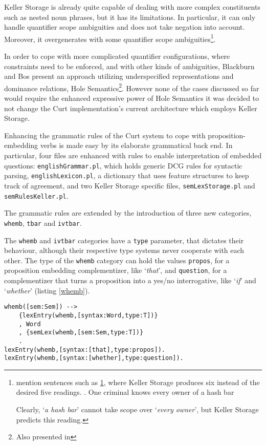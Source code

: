 \documentclass[a4paper]{article}
\newcommand{\abbr}{\textsf} %
\newcommand{\code}[1]{\texttt{#1}} %
\newcommand{\pn}{\textsf} %
\newcommand{\example}[1]{`\textit{#1}'} %
\newcommand{\curt}{\pn{Curt}}
\theoremstyle{remark}
\theoremstyle{remark}
\theoremstyle{definition}
\theoremstyle{definition}
\begin{document}
\pn{Keller Storage} is already quite capable
of dealing with more complex constituents such as nested noun phrases, but it
has its limitations. In particular, it can only handle quantifier scope
ambiguities and does not take negation into account. Moreover, it overgenerates
with some quantifier scope ambiguities\footnote{\cite{blackburnbos:cl1} mention
sentences such as \ref{ex:kellersucks}, where Keller Storage produces six
instead of the desired five readings.
\ex. One criminal knows every owner of a hash bar\label{ex:kellersucks}

Clearly, \example{a hash bar} cannot take scope over \example{every owner}, but
Keller Storage predicts this reading.}.

In order to cope with more complicated quantifier configurations, where
constraints need to be enforced, and with other kinds of ambiguities,
Blackburn and Bos present an approach utilizing underspecified representations and
dominance relations, \pn{Hole Semantics}\footnote{Also presented in %
}. 
However none of the cases discussed so far would require the enhanced
expressive power of \pn{Hole Semantics} it was decided to not change the \curt{}
implementation's current architecture which employs \pn{Keller Storage}.

Enhancing the grammatic rules of the \curt{} system to cope with
proposition-embedding verbs is made easy by its elaborate grammatical back
end. In particular, four files are enhanced with rules to enable interpretation
of embedded questions: \code{englishGrammar.pl}, which holds generic \abbr{DCG}
rules for syntactic parsing, \code{englishLexicon.pl}, a dictionary that uses
feature structures to keep track of agreement, and two \pn{Keller Storage}
specific files, \code{semLexStorage.pl} and \code{semRulesKeller.pl}.

The grammatic rules are extended by the introduction of three new categories,
\code{whemb}, \code{tbar} and \code{ivtbar}.

The \code{whemb} and \code{ivtbar} categories have a \code{type} parameter, that dictates
their behaviour, although their respective type systems never cooperate with
each other. The type of the \code{whemb} category can hold the values
\code{propos}, for a proposition embedding complementizer, like \example{that},
and \code{question}, for a complementizer that turns a proposition into a yes/no
interrogative, like \example{if} and \example{whether} (listing \ref{whemb}).

\begin{lstlisting}[label=whemb,caption={Syntactic and Lexical Rules for Complementizers},float]
whemb([sem:Sem]) -->
    {lexEntry(whemb,[syntax:Word,type:T])}
    , Word
    , {semLex(whemb,[sem:Sem,type:T])}
    .
lexEntry(whemb,[syntax:[that],type:propos]).
lexEntry(whemb,[syntax:[whether],type:question]).
\end{lstlisting}
\end{document}
